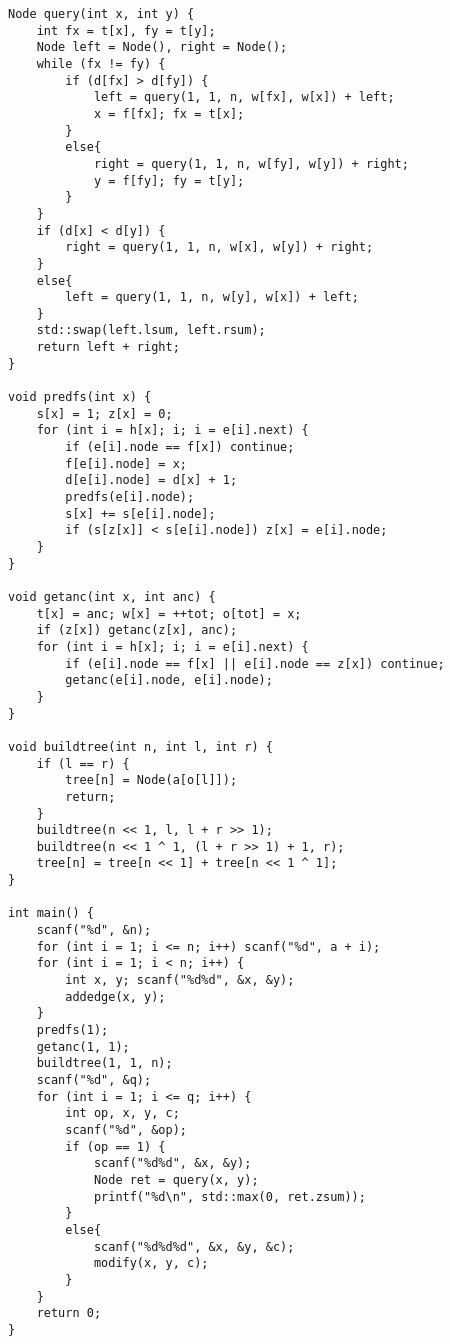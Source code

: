 \begin{lstlisting}
Node query(int x, int y) {
	int fx = t[x], fy = t[y];
	Node left = Node(), right = Node();
	while (fx != fy) {
		if (d[fx] > d[fy]) {
			left = query(1, 1, n, w[fx], w[x]) + left;
			x = f[fx]; fx = t[x];
		}
		else{
			right = query(1, 1, n, w[fy], w[y]) + right;
			y = f[fy]; fy = t[y];
		}
	}
	if (d[x] < d[y]) {
		right = query(1, 1, n, w[x], w[y]) + right;
	}
	else{
		left = query(1, 1, n, w[y], w[x]) + left;
	}
	std::swap(left.lsum, left.rsum);
	return left + right;
}

void predfs(int x) {
	s[x] = 1; z[x] = 0;
	for (int i = h[x]; i; i = e[i].next) {
		if (e[i].node == f[x]) continue;
		f[e[i].node] = x;
		d[e[i].node] = d[x] + 1;
		predfs(e[i].node);
		s[x] += s[e[i].node];
		if (s[z[x]] < s[e[i].node]) z[x] = e[i].node;
	}
}

void getanc(int x, int anc) {
	t[x] = anc; w[x] = ++tot; o[tot] = x;
	if (z[x]) getanc(z[x], anc);
	for (int i = h[x]; i; i = e[i].next) {
		if (e[i].node == f[x] || e[i].node == z[x]) continue;
		getanc(e[i].node, e[i].node);
	}
}

void buildtree(int n, int l, int r) {
	if (l == r) {
		tree[n] = Node(a[o[l]]);
		return;
	}
	buildtree(n << 1, l, l + r >> 1);
	buildtree(n << 1 ^ 1, (l + r >> 1) + 1, r);
	tree[n] = tree[n << 1] + tree[n << 1 ^ 1];
}

int main() {
	scanf("%d", &n);
	for (int i = 1; i <= n; i++) scanf("%d", a + i);
	for (int i = 1; i < n; i++) {
		int x, y; scanf("%d%d", &x, &y);
		addedge(x, y);
	}
	predfs(1);
	getanc(1, 1);
	buildtree(1, 1, n);
	scanf("%d", &q);
	for (int i = 1; i <= q; i++) {
		int op, x, y, c;
		scanf("%d", &op);
		if (op == 1) {
			scanf("%d%d", &x, &y);
			Node ret = query(x, y);
			printf("%d\n", std::max(0, ret.zsum));
		}
		else{
			scanf("%d%d%d", &x, &y, &c);
			modify(x, y, c);
		}
	}
	return 0;
}
\end{lstlisting}
